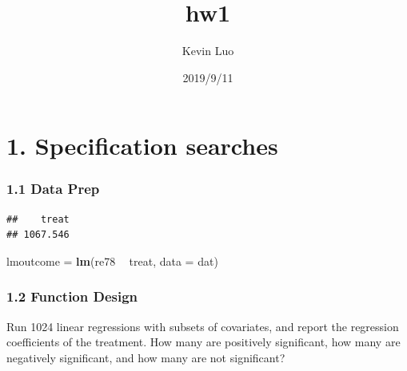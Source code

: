 \documentclass[]{article}
\title{hw1}
\author{Kevin Luo}
\date{2019/9/11}
\newenvironment{Shaded}{\begin{snugshade}}{\end{snugshade}}
\newcommand{\KeywordTok}[1]{\textcolor[rgb]{0.13,0.29,0.53}{\textbf{#1}}}
\newcommand{\DataTypeTok}[1]{\textcolor[rgb]{0.13,0.29,0.53}{#1}}
\newcommand{\DecValTok}[1]{\textcolor[rgb]{0.00,0.00,0.81}{#1}}
\newcommand{\StringTok}[1]{\textcolor[rgb]{0.31,0.60,0.02}{#1}}
\newcommand{\CommentTok}[1]{\textcolor[rgb]{0.56,0.35,0.01}{\textit{#1}}}
\newcommand{\OperatorTok}[1]{\textcolor[rgb]{0.81,0.36,0.00}{\textbf{#1}}}
\newcommand{\NormalTok}[1]{#1}
\begin{document}
\maketitle

\section*{1. Specification searches}\subsubsection*{1.1 Data Prep}

\begin{Shaded}
\end{Shaded}

\begin{verbatim}
##    treat 
## 1067.546
\end{verbatim}

\begin{Shaded}
\begin{Highlighting}[]
\NormalTok{lmoutcome =}\StringTok{ }\KeywordTok{lm}\NormalTok{(re78 }\OperatorTok{~}\StringTok{ }\NormalTok{treat, }\DataTypeTok{data =}\NormalTok{ dat)}
\end{Highlighting}
\end{Shaded}

\subsubsection*{1.2 Function Design}

Run 1024 linear regressions with subsets of covariates, and report the
regression coefficients of the treatment. How many are positively
significant, how many are negatively significant, and how many are not
significant?
\end{document}
